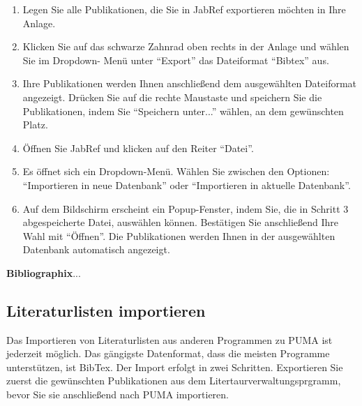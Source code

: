 \documentclass[a4paper,11pt,twoside]{scrbook}
\begin{document}
\begin{enumerate}
    \item Legen Sie alle Publikationen, die Sie in JabRef exportieren möchten in Ihre Anlage.
    \item Klicken Sie auf das schwarze Zahnrad oben rechts in der Anlage und wählen Sie im Dropdown- Menü unter \enquote{Export} das Dateiformat \enquote{Bibtex} aus.
    \item Ihre Publikationen werden Ihnen anschließend dem ausgewählten Dateiformat angezeigt. Drücken Sie auf die rechte Maustaste und speichern Sie die Publikationen, indem Sie \enquote{Speichern unter...} wählen, an dem gewünschten Platz. 
    \item Öffnen Sie JabRef und klicken auf den Reiter \enquote{Datei}. 
    \item Es öffnet sich ein Dropdown-Menü. Wählen Sie zwischen den Optionen: \enquote{Importieren in neue Datenbank} oder \enquote{Importieren in aktuelle Datenbank}.
    \item Auf dem Bildschirm erscheint ein Popup-Fenster, indem Sie, die in Schritt 3 abgespeicherte Datei, auswählen können. Bestätigen Sie anschließend Ihre Wahl mit \enquote{Öffnen}. Die Publikationen werden Ihnen in der ausgewählten Datenbank automatisch angezeigt.
\end{enumerate}
\textbf{Bibliographix}...
\subsection{Literaturlisten importieren}
Das Importieren von Literaturlisten aus anderen Programmen zu PUMA ist jederzeit möglich. Das gängigste Datenformat, dass die meisten Programme unterstützen, ist BibTex. \newline 
Der Import erfolgt in zwei Schritten. Exportieren Sie zuerst die gewünschten Publikationen aus dem Litertaurverwaltungsprgramm, bevor Sie sie anschließend nach PUMA importieren. 
\end{document}
